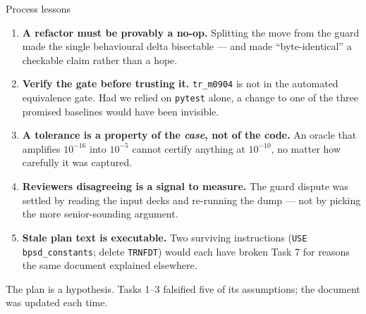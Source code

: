 \documentclass[10pt,aspectratio=169]{beamer}
\newcommand{\C}[1]{\texttt{\small #1}}          %
\begin{document}
\begin{frame}{Process lessons}

\begin{enumerate}
  \item \textbf{A refactor must be provably a no-op.} Splitting the move from the guard made the single
        behavioural delta bisectable --- and made ``byte-identical'' a checkable claim rather than a hope.

  \item \textbf{Verify the gate before trusting it.} \C{tr\_m0904} is not in the automated equivalence gate.
        Had we relied on \C{pytest} alone, a change to one of the three promised baselines would have been invisible.

  \item \textbf{A tolerance is a property of the \emph{case}, not of the code.} An oracle that amplifies
        $10^{-16}$ into $10^{-5}$ cannot certify anything at $10^{-10}$, no matter how carefully it was captured.

  \item \textbf{Reviewers disagreeing is a signal to measure.} The guard dispute was settled by reading the
        input decks and re-running the dump --- not by picking the more senior-sounding argument.

  \item \textbf{Stale plan text is executable.} Two surviving instructions (\C{USE bpsd\_constants}; delete
        \C{TRNFDT}) would each have broken Task 7 for reasons the same document explained elsewhere.
\end{enumerate}

\vspace{0.3em}
\begin{block}{}
\centering
\small The plan is a hypothesis. Tasks 1--3 falsified five of its assumptions; the document was updated each time.
\end{block}
\end{frame}
\end{document}
